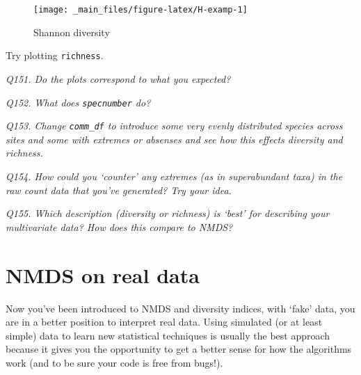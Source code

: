 \documentclass[
  11pt,
  a4paper,
]{book}
\newenvironment{Shaded}{\begin{snugshade}}{\end{snugshade}}
\newcommand{\AttributeTok}[1]{\textcolor[rgb]{0.77,0.63,0.00}{#1}}
\newcommand{\ConstantTok}[1]{\textcolor[rgb]{0.00,0.00,0.00}{#1}}
\newcommand{\DecValTok}[1]{\textcolor[rgb]{0.00,0.00,0.81}{#1}}
\newcommand{\FunctionTok}[1]{\textcolor[rgb]{0.00,0.00,0.00}{#1}}
\newcommand{\NormalTok}[1]{#1}
\newcommand{\OtherTok}[1]{\textcolor[rgb]{0.56,0.35,0.01}{#1}}
\newcommand{\SpecialCharTok}[1]{\textcolor[rgb]{0.00,0.00,0.00}{#1}}
\newcommand{\StringTok}[1]{\textcolor[rgb]{0.31,0.60,0.02}{#1}}
\begin{document}
\begin{Shaded}
\end{Shaded}

\begin{figure}

{\centering \texttt{[image: \_main\_files/figure-latex/H-examp-1]} 

}

\caption{Shannon diversity}\label{fig:H-examp}
\end{figure}

Try plotting \texttt{richness}.

\emph{Q151. Do the plots correspond to what you expected?}

\emph{Q152. What does \texttt{specnumber} do?}

\emph{Q153. Change \texttt{comm\_df} to introduce some very evenly distributed species across sites and some with extremes or absenses and see how this effects diversity and richness.}

\emph{Q154. How could you `counter' any extremes (as in superabundant taxa) in the raw count data that you've generated? Try your idea.}

\emph{Q155. Which description (diversity or richness) is `best' for describing your multivariate data? How does this compare to NMDS?}

\hypertarget{nmds-on-real-data}{%
\section{NMDS on real data}\label{nmds-on-real-data}}

Now you've been introduced to NMDS and diversity indices, with `fake' data, you are in a better position to interpret real data. Using simulated (or at least simple) data to learn new statistical techniques is usually the best approach because it gives you the opportunity to get a better sense for how the algorithms work (and to be sure your code is free from bugs!).
\end{document}
